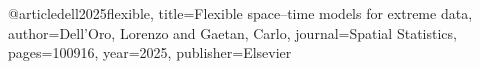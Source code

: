 @article{dell2025flexible,
  title={Flexible space--time models for extreme data},
  author={Dell’Oro, Lorenzo and Gaetan, Carlo},
  journal={Spatial Statistics},
  pages={100916},
  year={2025},
  publisher={Elsevier}
}
